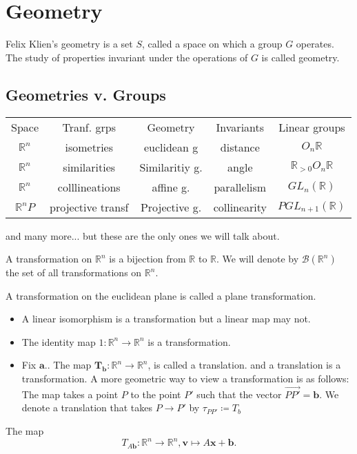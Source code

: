 
\section{Geometry}
\begin{definition}
  Felix Klien's geometry is a set \( S \), called a space
  on which a group \( G \) operates. The study of properties invariant
  under the operations of \( G \) is called geometry. 
\end{definition}

\subsection{Geometries v. Groups}
\begin{center}
\begin{tabular}{ c c c c c}
  Space & Tranf. grps & Geometry & Invariants & Linear groups \\
  \( \mathbb{R}^n \) & isometries & euclidean g & distance & \( O_n{\mathbb{R}} \) \\
  \( \mathbb{R}^n \) & similarities & Similaritiy g. & angle & \( \mathbb{R}_{>0} O_n{\mathbb{R}}\) \\
  \( \mathbb{R}^n \) & colllineations & affine g. & parallelism & \(GL_n(\mathbb{R})\) \\
  \( \mathbb{R}^nP \) & projective transf & Projective g. & collinearity & \( PGL_{n+1}(\mathbb{R})\)
\end{tabular}
\end{center}
and many more...
but these are the only ones we will talk about.

\begin{definition}
  A transformation on \( \mathbb{R}^n \) is a bijection from \( \mathbb{R} \) to \( \mathbb{R} \).
  We will denote by \( \mathscr{B}(\mathbb{R}^n) \) the set of all transformations on \(\mathbb{R}^n\).
\end{definition}

\begin{definition}
  A transformation on the euclidean plane is called a plane transformation.
\end{definition}

 \begin{itemize}
  \item A linear isomorphism is a transformation but a linear map may not. 
  \item The identity map \( 1: \mathbb{R}^n \to \mathbb{R}^n \) is a transformation.
  \item Fix \( \boldsymbol{a}. \). The map \( \boldsymbol{T_b}: \mathbb{R}^n \to \mathbb{R}^n  \), is called a translation.
  and a translation is a transformation. A more geometric way to view a transformation is as follows: The map
  takes a point $P$ to the point $P'$ such that the vector \( \overrightarrow{PP'} = \boldsymbol{b}\).
  We denote a translation that takes \( P \to P' \) by \( \tau_{PP'} \coloneqq  T_b\)
 \end{itemize}

 \begin{notation}
  The map \[
    T_{A \boldsymbol{b}}: \mathbb{R}^n \to \mathbb{R}^n, \boldsymbol{v} \mapsto A \boldsymbol{x} + \boldsymbol{b}
  .\] 
 \end{notation}

 
